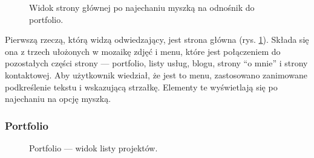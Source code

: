 \documentclass[a4paper, 12pt]{article}
\numberwithin{figure}{section}
\begin{document}
\begin{sloppypar}
\begin{figure}[H] 
    \vspace{0.5cm}
    \centering
   \caption{Widok strony głównej po najechaniu myszką na odnośnik do portfolio.}
   \label{fig:gotowa-aplikacja-1.jpg}
\end{figure}

Pierwszą rzeczą, którą widzą odwiedzający, jest strona główna (rys. \ref{fig:gotowa-aplikacja-1.jpg}). Składa się ona z trzech ułożonych w mozaikę zdjęć i menu, które jest połączeniem do pozostałych części strony --- portfolio, listy usług, blogu, strony ``o mnie'' i strony kontaktowej. Aby użytkownik wiedział, że jest to menu, zastosowano zanimowane podkreślenie tekstu i wskazującą strzałkę. Elementy te wyświetlają się po najechaniu na opcję myszką. 

\subsubsection*{Portfolio}

\begin{figure}[H] 
    \vspace{0.5cm}
    \centering
   \caption{Portfolio --- widok listy projektów.}
   \label{fig:gotowa-aplikacja-2.jpg}
\end{figure}


\end{sloppypar}
\end{document}
